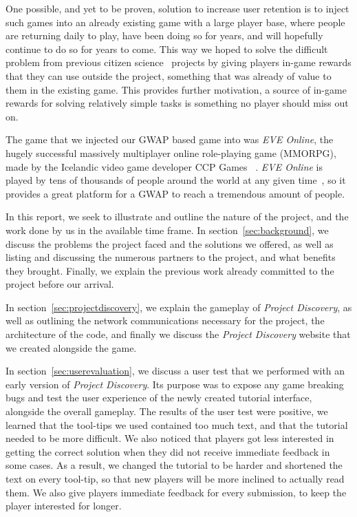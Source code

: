 One possible, and yet to be proven, solution to increase user retention is to inject such games into an already existing game with a large player base, where people are returning daily to play, have been doing so for years, and will hopefully continue to do so for years to come. This way we hoped to solve the difficult problem from previous citizen science~\cite{citizenscience} projects by giving players in-game rewards that they can use outside the project, something that was already of value to them in the existing game. This provides further motivation, a source of in-game rewards for solving relatively simple tasks is something no player should miss out on.

The game that we injected our GWAP based game into was \emph{EVE Online}, the hugely successful massively multiplayer online role-playing game (MMORPG), made by the Icelandic video game developer CCP Games~\cite{CCP} . \emph{EVE Online} is played by tens of thousands of people around the world at any given time~\cite{nature}, so it provides a great platform for a GWAP to reach a tremendous amount of people.


In this report, we seek to illustrate and outline the nature of the project, and the work done by us in the available time frame. In section~\ref{sec:background}, we discuss the problems the project faced and the solutions we offered, as well as listing and discussing the numerous partners to the project, and what benefits they brought. Finally, we explain the previous work already committed to the project before our arrival.

In section~\ref{sec:projectdiscovery}, we explain the gameplay of \emph{Project Discovery}, as well as outlining the network communications necessary for the project, the architecture of the code, and finally we discuss the \emph{Project Discovery} website that we created alongside the game. 

In section~\ref{sec:userevaluation}, we discuss a user test that we performed with an early version of \emph{Project Discovery}. Its purpose was to expose any game breaking bugs and test the user experience of the newly created tutorial interface, alongside the overall gameplay. The results of the user test were positive, we learned that the tool-tips we used contained too much text, and that the tutorial needed to be more difficult. We also noticed that players got less interested in getting the correct solution when they did not receive immediate feedback in some cases. As a result, we changed the tutorial to be harder and shortened the text on every tool-tip, so that new players will be more inclined to actually read them. We also give players immediate feedback for every submission, to keep the player interested for longer.

